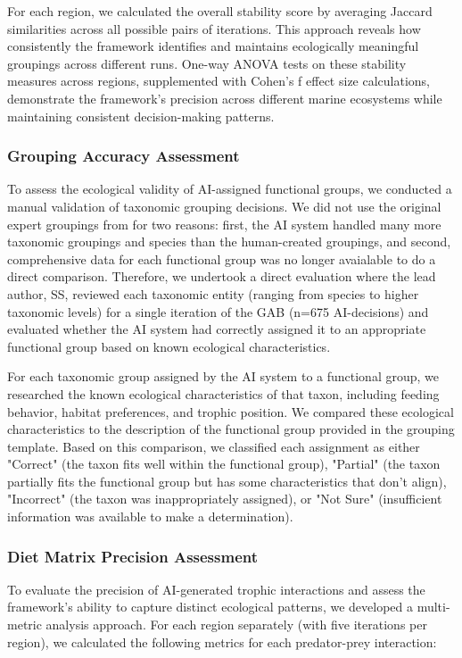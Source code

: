 For each region, we calculated the overall stability score by averaging Jaccard similarities across all possible pairs of iterations. This approach reveals how consistently the framework identifies and maintains ecologically meaningful groupings across different runs. One-way ANOVA tests on these stability measures across regions, supplemented with Cohen's f effect size calculations, demonstrate the framework's precision across different marine ecosystems while maintaining consistent decision-making patterns.

\subsubsection{Grouping Accuracy Assessment}
\label{sec:taxonomic_accuracy}
To assess the ecological validity of AI-assigned functional groups, we conducted a manual validation of taxonomic grouping decisions. We did not use the original expert groupings from \citep{Fulton2018} for two reasons: first, the AI system handled many more taxonomic groupings and species than the human-created groupings, and second, comprehensive data for each functional group was no longer avaialable to do a direct comparison. Therefore, we undertook a direct evaluation where the lead author, SS, reviewed each taxonomic entity (ranging from species to higher taxonomic levels) for a single iteration of the GAB (n=675 AI-decisions) and evaluated whether the AI system had correctly assigned it to an appropriate functional group based on known ecological characteristics.

For each taxonomic group assigned by the AI system to a functional group, we researched the known ecological characteristics of that taxon, including feeding behavior, habitat preferences, and trophic position. We compared these ecological characteristics to the description of the functional group provided in the grouping template. Based on this comparison, we classified each assignment as either "Correct" (the taxon fits well within the functional group), "Partial" (the taxon partially fits the functional group but has some characteristics that don't align), "Incorrect" (the taxon was inappropriately assigned), or "Not Sure" (insufficient information was available to make a determination).


\subsubsection{Diet Matrix Precision Assessment}
To evaluate the precision of AI-generated trophic interactions and assess the framework's ability to capture distinct ecological patterns, we developed a multi-metric analysis approach. For each region separately (with five iterations per region), we calculated the following metrics for each predator-prey interaction:

